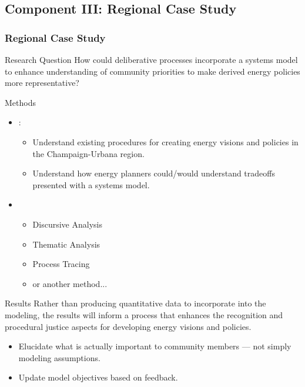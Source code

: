 \subsection{Component III: Regional Case Study}
\begin{frame}[allowframebreaks]
    \frametitle{Regional Case Study}

    \begin{block}{Research Question}
        How could deliberative processes incorporate a systems model to enhance
        understanding of community priorities to make derived energy policies
        more representative?
    \end{block}

    \begin{block}{Methods}
        \begin{itemize}
            \item {}: 
            \begin{itemize}
                \item Understand existing procedures for creating energy visions
                and policies in the Champaign-Urbana region.
                \item Understand how energy planners could/would understand
                tradeoffs presented with a systems model.
            \end{itemize}
            \item {} %
            \begin{itemize}
                \item Discursive Analysis %
                \item Thematic Analysis
                \item Process Tracing
                \item or another method... 
            \end{itemize}
        \end{itemize}
    \end{block}
    \begin{block}{Results}
        Rather than producing quantitative data to incorporate into the
        modeling, the results will inform a process that enhances the
        recognition and procedural justice aspects for developing energy visions
        and policies.

        \begin{itemize}
            \item Elucidate what is actually important to community members ---
            not simply modeling assumptions.
            \item Update model objectives based on feedback.
        \end{itemize}
    \end{block}

\end{frame}

